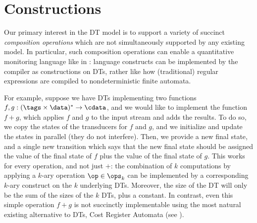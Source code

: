 \section{Constructions}
\label{dt:sec:constructions}

Our primary interest in the DT model is to support a variety of succinct \emph{composition operations} which are not simultaneously supported by any existing model. In particular, such composition operations can enable a quantitative monitoring language like \QREpast{} in : language constructs can be implemented by the compiler as constructions on DTs, rather like how (traditional) regular expressions are compiled to nondeterministic finite automata.

For example, suppose we have DTs implementing two functions $f, g: (\tags \times \data)^{*} \to \cdata$, and we would like to implement the function $f + g$, which applies $f$ and $g$ to the input stream and adds the results.
To do so, we copy the states of the transducers for $f$ and $g$,
and we initialize and update the states in parallel (they do not interfere).
Then, we provide a new final state, and a single new transition which says that the new final state should be assigned the value of the final state of $f$ plus the value of the final state of $g$.
This works for every operation, and not just $+$: the combination of $k$ computations by applying a $k$-ary operation $\op \in \ops_k$ can be implemented by a corresponding $k$-ary construct on the $k$ underlying DTs. Moreover, the size of the DT will only be the sum of the sizes of the $k$ DTs, plus a constant.
In contrast, even this simple operation $f+g$ is not succinctly implementable using the most natural existing alternative to DTs, Cost Register Automata (see ).

